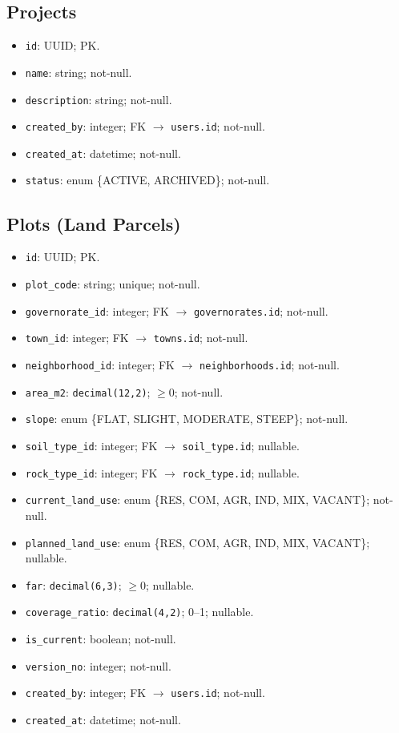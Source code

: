 \documentclass[12pt,oneside]{report}
\begin{document}
\subsection{Projects}
\begin{itemize}[leftmargin=*,itemsep=2pt]
  \item \texttt{id}: UUID; PK.
  \item \texttt{name}: string; not-null.
  \item \texttt{description}: string; not-null.
  \item \texttt{created\_by}: integer; FK $\rightarrow$ \texttt{users.id}; not-null.
  \item \texttt{created\_at}: datetime; not-null.
  \item \texttt{status}: enum \{ACTIVE, ARCHIVED\}; not-null.
\end{itemize}

\subsection{Plots (Land Parcels)}
\begin{itemize}[leftmargin=*,itemsep=2pt]
  \item \texttt{id}: UUID; PK.
  \item \texttt{plot\_code}: string; unique; not-null.
  \item \texttt{governorate\_id}: integer; FK $\rightarrow$ \texttt{governorates.id}; not-null.
  \item \texttt{town\_id}: integer; FK $\rightarrow$ \texttt{towns.id}; not-null.
  \item \texttt{neighborhood\_id}: integer; FK $\rightarrow$ \texttt{neighborhoods.id}; not-null.
  \item \texttt{area\_m2}: \texttt{decimal(12,2)}; $\geq 0$; not-null.
  \item \texttt{slope}: enum \{FLAT, SLIGHT, MODERATE, STEEP\}; not-null.
  \item \texttt{soil\_type\_id}: integer; FK $\rightarrow$ \texttt{soil\_type.id}; nullable.
  \item \texttt{rock\_type\_id}: integer; FK $\rightarrow$ \texttt{rock\_type.id}; nullable.
  \item \texttt{current\_land\_use}: enum \{RES, COM, AGR, IND, MIX, VACANT\}; not-null.
  \item \texttt{planned\_land\_use}: enum \{RES, COM, AGR, IND, MIX, VACANT\}; nullable.
  \item \texttt{far}: \texttt{decimal(6,3)}; $\geq 0$; nullable.
  \item \texttt{coverage\_ratio}: \texttt{decimal(4,2)}; 0–1; nullable.
  \item \texttt{is\_current}: boolean; not-null.
  \item \texttt{version\_no}: integer; not-null.
  \item \texttt{created\_by}: integer; FK $\rightarrow$ \texttt{users.id}; not-null.
  \item \texttt{created\_at}: datetime; not-null.
\end{itemize}
\end{document}
